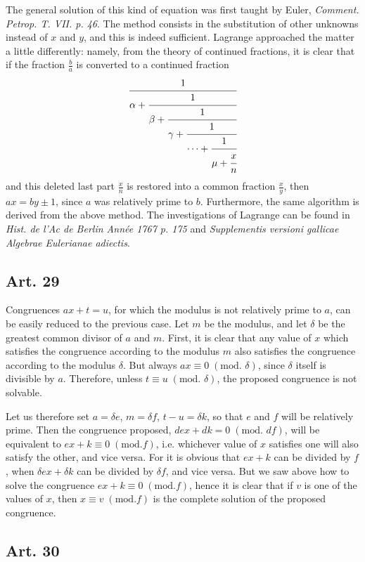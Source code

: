 \documentclass{book}
\theoremstyle{plain}
\theoremstyle{remark}
\begin{document}
The general solution of this kind of equation was first taught by Euler, \textit{Comment. Petrop. T. VII. p. 46}.  The method consists in the substitution of other unknowns instead of $x$ and $y$, and this is indeed sufficient. Lagrange approached the matter a little differently: namely, from the theory of continued fractions, it is clear that if the fraction $\frac{b}{a}$ is converted to a continued fraction
\[ \cfrac{1}{\alpha + \cfrac{1}{\beta+ \cfrac{1}{\gamma +\cfrac{1}{\cdots + \cfrac{1}{\mu + \cfrac{x}{n}}}}}} \]
and this deleted last part $\frac{x}{n}$ is restored into a common fraction $\frac{x}{y}$, then $ax = by \pm 1$, since $a$ was relatively prime to $b$.  Furthermore, the same algorithm is derived from the above method.  The investigations of Lagrange can be found in \textit{Hist. de l'Ac de Berlin Ann\'ee 1767 p. 175} and \textit{Supplementis versioni gallicae Algebrae Eulerianae adiectis}.

\subsection*{Art. 29}

Congruences $ax+t = u$, for which the modulus is not relatively prime to $a$, can be easily reduced to the previous case.   Let $m$ be the modulus, and let $\delta$ be the greatest common divisor of $a$ and $m$.  First, it is clear that any value of $x$ which satisfies the congruence according to the modulus $m$ also satisfies the congruence according to the modulus $\delta$.  But always $ax \equiv 0 \; (\textrm{mod. }\delta)$, since $\delta$ itself is divisible by $a$.  Therefore, unless $t \equiv u\;(\textrm{mod. } \delta)$, the proposed congruence is not solvable. 

Let us therefore set $a = \delta e$, $m = \delta f$, $t-u = \delta k$, so that $e$ and $f$ will be relatively prime.  Then the congruence proposed, $dex + dk = 0 \;(\textrm{mod. } df)$, will be equivalent to $ex + k \equiv 0 \; (\textrm{mod.} f)$, i.e. whichever value of $x$ satisfies one will also satisfy the other, and vice versa.  For it is obvious that $ex+k$ can be divided by $f$, when $\delta ex + \delta k$ can be divided by $\delta f$, and vice versa.    But we saw above how to solve the congruence $ex+k\equiv0\;(\mathrm{mod. } f)$, hence it is clear that if $v$ is one of the values of $x$, then $x \equiv v \;(\mathrm{mod. } f)$ is the complete solution of the proposed congruence.

\subsection*{Art. 30} 
\end{document}
